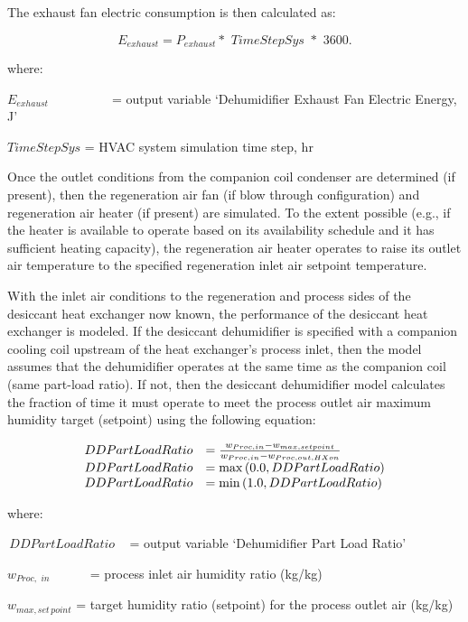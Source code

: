 The exhaust fan electric consumption is then calculated as:

\begin{equation}
{E_{exhaust}} = {P_{exhaust}}*\,\,TimeStepSys\,\,*\,\,3600.
\end{equation}

where:

\({E_{exhaust}}\) ~~~~~~ ~~ = output variable `Dehumidifier Exhaust Fan Electric Energy, J'

\(TimeStepSys\) = HVAC system simulation time step, hr

Once the outlet conditions from the companion coil condenser are determined (if present), then the regeneration air fan (if blow through configuration) and regeneration air heater (if present) are simulated. To the extent possible (e.g., if the heater is available to operate based on its availability schedule and it has sufficient heating capacity), the regeneration air heater operates to raise its outlet air temperature to the specified regeneration inlet air setpoint temperature.

With the inlet air conditions to the regeneration and process sides of the desiccant heat exchanger now known, the performance of the desiccant heat exchanger is modeled. If the desiccant dehumidifier is specified with a companion cooling coil upstream of the heat exchanger's process inlet, then the model assumes that the dehumidifier operates at the same time as the companion coil (same part-load ratio). If not, then the desiccant dehumidifier model calculates the fraction of time it must operate to meet the process outlet air maximum humidity target (setpoint) using the following equation:

\begin{equation}
  \begin{array}{rl}
    DDPartLoadRatio &= \frac{w_{Proc,in} - w_{max, setpoint}}{w_{Proc,in} - w_{Proc,out,HXon}} \\
    DDPartLoadRatio &= \max\PB{0.0,DDPartLoadRatio} \\
    DDPartLoadRatio &= \min\PB{1.0,DDPartLoadRatio}
  \end{array}
\end{equation}

where:

\(\,DDPartLoadRatio\) ~ = output variable `Dehumidifier Part Load Ratio'

\({w_{Proc,\,\,in}}\) ~~~~~ = process inlet air humidity ratio (kg/kg)

\({w_{max, set\,point}}\) = target humidity ratio (setpoint) for the process outlet air (kg/kg)

